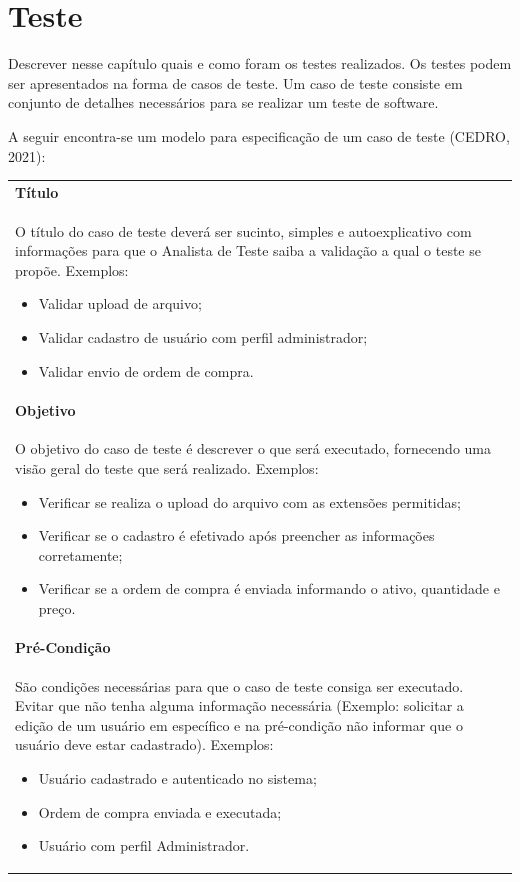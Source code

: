 \chapter{Teste}
\label{cap:08}

Descrever nesse capítulo quais e como foram os testes realizados. Os testes podem ser apresentados na forma de casos de teste. Um caso de teste consiste em conjunto de detalhes necessários para se realizar um teste de software.

A seguir encontra-se um modelo para especificação de um caso de teste (CEDRO, 2021):

\begin{center}
\begin{tabular}{ | p{15cm} | } 
    \hline
    \textbf{Título}            \\
	O título do caso de teste deverá ser sucinto, simples e autoexplicativo com informações para que o Analista de Teste saiba a validação a qual o teste se propõe. Exemplos:
    \begin{itemize}
	    \item Validar upload de arquivo;
	    \item Validar cadastro de usuário com perfil administrador;
    	\item Validar envio de ordem de compra.
    \end{itemize} \\
    \hline

    \textbf{Objetivo}            \\
	O objetivo do caso de teste é descrever o que será executado, fornecendo uma visão geral do teste que será realizado. Exemplos:
    \begin{itemize}
	    \item Verificar se realiza o upload do arquivo com as extensões permitidas;
	    \item Verificar se o cadastro é efetivado após preencher as informações corretamente;
    	\item Verificar se a ordem de compra é enviada informando o ativo, quantidade e preço.
    \end{itemize} \\
    \hline
    
    \textbf{Pré-Condição}            \\
	São condições necessárias para que o caso de teste consiga ser executado. Evitar que não tenha alguma informação necessária (Exemplo: solicitar a edição de um usuário em específico e na pré-condição não informar que o usuário deve estar cadastrado). Exemplos:
    \begin{itemize}
	    \item Usuário cadastrado e autenticado no sistema;
	    \item Ordem de compra enviada e executada;
    	\item Usuário com perfil Administrador.
    \end{itemize} \\
    \hline
\end{tabular}
\end{center}

